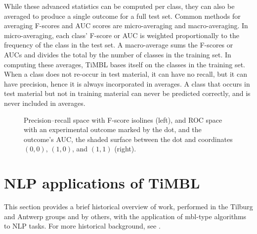 \documentclass{report}
\begin{document}
While these advanced statistics can be computed per class, they can
also be averaged to produce a single outcome for a full test
set. Common methods for averaging F-scores and AUC scores are
micro-averaging and macro-averaging. In micro-averaging, each class'
F-score or AUC is weighted proportionally to the frequency of the
class in the test set. A macro-average sums the F-scores or AUCs
and divides the total by the number of classes in the training set. In
computing these averages, TiMBL bases itself on the classes in the
training set. When a class does not re-occur in test material, it can
have no recall, but it can have precision, hence it is always
incorporated in averages. A class that occurs in test material but not
in training material can never be predicted correctly, and is never
included in averages.

\begin{figure}
\begin{center}

\begin{minipage}[t]{0.53\textwidth}
\end{minipage}\hfill
\begin{minipage}[t]{0.47\textwidth}
\end{minipage}

\end{center}
\caption{Precision--recall space with F-score isolines (left), and ROC
  space with an experimental outcome marked by the dot, and the
  outcome's AUC, the shaded surface between the dot and coordinates
  $(0,0)$, $(1,0)$, and $(1,1)$ (right). \label{spaces}}
\end{figure}



\section{NLP applications of TiMBL}
\label{furtherreading}

This section provides a brief historical overview of work, performed
in the Tilburg and Antwerp groups and by others, with the application
of {\sc mbl}-type algorithms to NLP tasks. For more historical
background, see \cite{Daelemans+05}.
\end{document}
